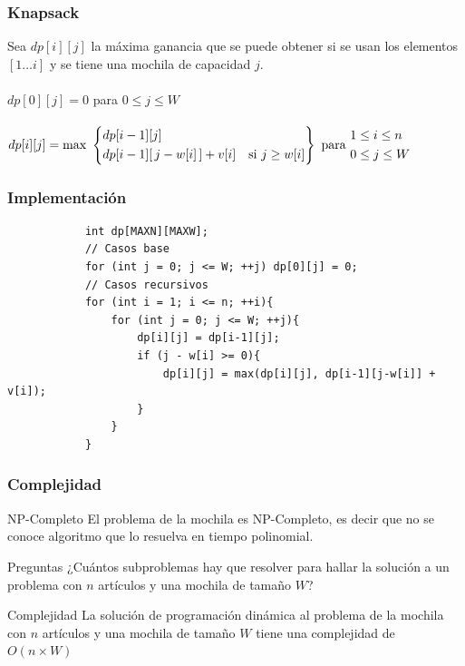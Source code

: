 \documentclass{beamer}
\begin{document}
	\begin{frame}
		\frametitle{Knapsack}
		Sea $dp[i][j]$ la máxima ganancia que se puede obtener si se usan los elementos $[1 \ldots i]$ y se tiene una mochila de capacidad $j$. \\ \quad \\
		$dp[0][j] = 0$ \quad para $0 \leq j \leq W$ \\ \quad \\
		$ 
			dp[i][j] = \text{max } 
			\left\{
				\begin{aligned}
					& dp[i-1][j]\\
					& dp[i-1][\,j - w[i]\,] + v[i] \text{\quad si } j \geq w[i] \\
				\end{aligned}
			\right\}
			\text{ para } 
				\begin{aligned}
					& 1 \leq i \leq n\\
					& 0 \leq j \leq W
				\end{aligned}
		$
	\end{frame}
	
	\begin{frame}[fragile]
		\frametitle{Implementación}
		\begin{lstlisting}
		    int dp[MAXN][MAXW];
		    // Casos base
		    for (int j = 0; j <= W; ++j) dp[0][j] = 0;
		    // Casos recursivos
		    for (int i = 1; i <= n; ++i){
		        for (int j = 0; j <= W; ++j){
		            dp[i][j] = dp[i-1][j];
		            if (j - w[i] >= 0){
		                dp[i][j] = max(dp[i][j], dp[i-1][j-w[i]] + v[i]);
		            }
		        }
		    }
		\end{lstlisting}
	\end{frame}
	
	\begin{frame}
		\frametitle{Complejidad}
		\begin{block}{NP-Completo}
			El problema de la mochila es NP-Completo, es decir que no se conoce algoritmo que lo resuelva en tiempo polinomial.
		\end{block}
		\pause
		\begin{alertblock}{Preguntas}
			¿Cuántos subproblemas hay que resolver para hallar la solución a un problema con $n$ artículos y una mochila de tamaño $W$?
		\end{alertblock}
		\pause
		\begin{block}{Complejidad}
			La solución de programación dinámica al problema de la mochila con $n$ artículos y una mochila de tamaño $W$ tiene una complejidad de $O(n \times W)$
		\end{block}
	\end{frame}
\end{document}
